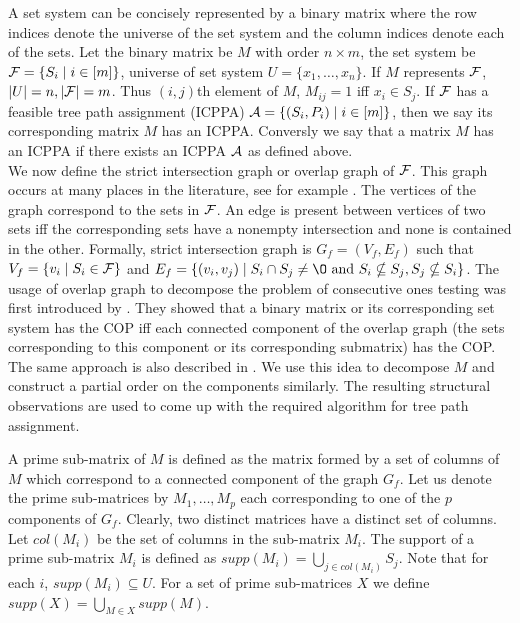 \documentclass{llncs}
\def\cA{{\cal A}}
\def\cF{{\cal F}}
\begin{document}
\noindent
A set system can be concisely represented by a binary matrix where the
row indices denote the universe of the set system and the column
indices denote each of the sets. Let the binary matrix be $M$ with
order $n \times m$, the set system be $\cF = \{S_i \mid i \in [m]\}$,
universe of set system $U = \{x_1, \dots ,x_n\}$. If $M$ represents
$\cF$, $|U| = n, |\cF| = m$. Thus $(i,j)$th element of $M$, $M_{ij} =
1$ iff $x_i \in S_j$. If $\cF$ has a feasible tree path assignment
(ICPPA) $\cA = \{(S_i,P_i) \mid i \in [m]\}$, then we say its
corresponding matrix $M$ has an ICPPA. Conversly we say that a matrix
$M$ has an ICPPA if there exists an ICPPA $\cA$ as defined
above.\\
\noindent
We now define the strict intersection graph or overlap graph of
$\cF$. This graph occurs at many places in the literature, see for
example \cite{kklv10, wlh02, nsnrs09}. The vertices of the graph
correspond to the sets in $\cF$.  An edge is present between vertices
of two sets iff the corresponding sets have a nonempty intersection
and none is contained in the other. Formally, strict intersection graph is
$G_f = (V_f, E_f)$ such that $V_f = \{v_i \mid S_i \in \cF\}$ and $E_f
= \{(v_i, v_j) \mid S_i \cap S_j \ne \O \text{ and }S_i \nsubseteq
S_j, S_j \nsubseteq S_i \}$.  The usage of overlap graph to
decompose the problem of consecutive ones testing was first introduced
by \cite{fg65}. They showed that a binary matrix or its corresponding
set system has the COP iff each connected component of the overlap
graph (the sets corresponding to this component or its corresponding
submatrix) has the COP. The same approach is also described in
\cite{wlh02,nsnrs09}. We use this idea to decompose $M$ and construct
a partial order on the components similarly. The resulting structural
observations are used to come up with the required algorithm for tree
path assignment. 

A prime sub-matrix of $M$ is defined as the matrix formed by a set of
columns of $M$ which correspond to a connected component of the graph
$G_f$.  Let us denote the prime sub-matrices by $M_1,\ldots,M_p$ each
corresponding to one of the $p$ components of $G_f$. Clearly, two
distinct matrices have a distinct set of columns.  Let $col(M_i)$ be
the set of columns in the sub-matrix $M_i$.  The support of a prime
sub-matrix $M_i$ is defined as $supp(M_i) = \displaystyle \bigcup_{j
  \in col(M_i)}S_j$.  Note that for each $i$, $supp(M_i) \subseteq U$.
For a set of prime sub-matrices $X$ we define
$supp(X) = \displaystyle \bigcup_{M \in X} supp(M)$. \\
\end{document}
